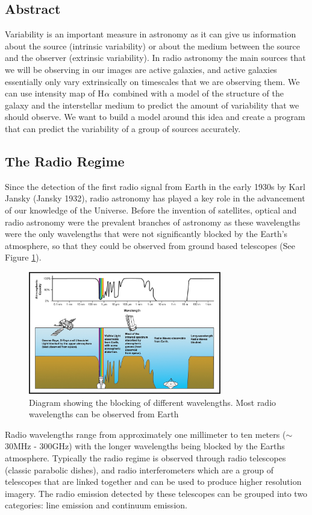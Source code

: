 \documentclass[10pt,a4paper]{article}
\begin{document}
\subsection{Abstract}
Variability is an important measure in astronomy as it can give us information about the source (intrinsic variability) or about the medium between the source and the observer (extrinsic variability). In radio astronomy the main sources that we will be observing in our images are active galaxies, and active galaxies essentially only vary extrinsically on timescales that we are observing them. We can use intensity map of H$\ce{\alpha}$ combined with a model of the structure of the galaxy and the interstellar medium to predict the amount of variability that we should observe. We want to build a model around this idea and create a program that can predict the variability of a group of sources accurately.
\subsection{The Radio Regime} \label{radio}
Since the detection of the first radio signal from Earth in the early 1930s by Karl Jansky (Jansky 1932), radio astronomy has played a key role in the advancement of our knowledge of the Universe. Before the invention of satellites, optical and radio astronomy were the prevalent branches of astronomy as these wavelengths were the only wavelengths that were not significantly blocked by the Earth's atmosphere, so that they could be observed from ground based telescopes (See Figure \ref{abs}).

\begin{figure}[H]
\begin{center}
	\includegraphics[width=0.75\textwidth]{atmo-abs}
	\caption{Diagram showing the blocking of different wavelengths. Most radio wavelengths can be observed from Earth\footnotemark}
	\label{abs}
\end{center}
\end{figure}
Radio wavelengths range from approximately one millimeter to ten meters ($\sim$ 30MHz - 300GHz) with the longer wavelengths being blocked by the Earths atmosphere. Typically the radio regime is observed through radio telescopes (classic parabolic dishes), and radio interferometers which are a group of telescopes that are linked together and can be used to produce higher resolution imagery. The radio emission detected by these telescopes can be grouped into two categories: line emission and continuum emission.
\end{document}
